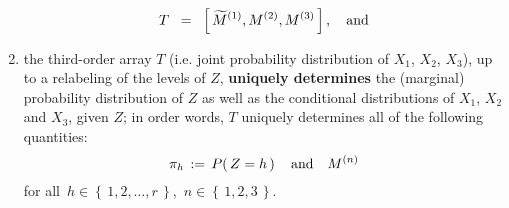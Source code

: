 \begin{corollary}
\begin{enumerate}
\begin{equation*}
	T \;\; = \;\; \left[\,\widetilde{M}^{(1)},M^{(2)},M^{(3)}\,\right],
	\quad
	\textnormal{and}
	\end{equation*}
\item
	the third-order array $T$ (i.e. joint probability distribution of $X_{1}$, $X_{2}$, $X_{3}$),
	up to a relabeling of the levels of $Z$, \textbf{uniquely determines} the (marginal)
	probability distribution of $Z$ as well as the conditional distributions of
	$X_{1}$, $X_{2}$ and $X_{3}$, given $Z$;
	in order words, $T$ uniquely determines all of the following quantities:
	\begin{equation*}
	\pi_{h} \,:=\, P\!\left(\,Z = h\,\right)
	\quad\textnormal{and}\quad
	M^{(n)}
	\end{equation*}
	for all \,$h \in \left\{\,1,2,\ldots,r\,\right\}$, \,$n \in \left\{\,1,2,3\,\right\}$.
\end{enumerate}
\end{corollary}
\proof
